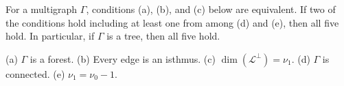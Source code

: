 For a multigraph $\Gamma$, conditions (a), (b), and (c) below are equivalent. If two of the conditions hold including at least one from among (d) and (e), then all five hold. In particular, if $\Gamma$ is a tree, then all five hold.

(a) $\Gamma$ is a forest.
(b) Every edge is an isthmus.
(c) $\dim(\mathcal{L}^\perp) = \nu_1$.
(d) $\Gamma$ is connected.
(e) $\nu_1 = \nu_0 - 1$.
